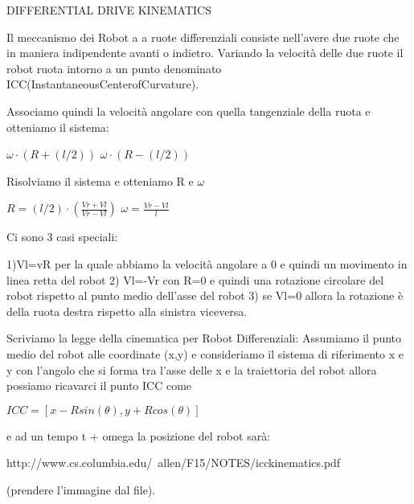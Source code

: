 \documentclass[11pt]{article}
\begin{document}
DIFFERENTIAL DRIVE KINEMATICS

Il meccanismo dei Robot a a ruote differenziali consiste nell'avere due ruote che in maniera indipendente avanti o indietro.
Variando la velocità delle due ruote il robot ruota intorno a un punto denominato ICC(InstantaneousCenterofCurvature).

Associamo quindi la velocità angolare con quella tangenziale della ruota e otteniamo il sistema:

$\omega\cdot(R+(l/2))$
$\omega\cdot(R-(l/2))$

Risolviamo il sistema e otteniamo R e $\omega$

$ R = (l/2)\cdot(\frac{Vr+Vl}{Vr-Vl})$
$\omega=\frac{Vr-Vl}{l}$

Ci sono 3 casi speciali:

1)Vl=vR per la quale abbiamo la velocità angolare a 0 e quindi un movimento in linea retta del robot
2) Vl=-Vr con R=0 e quindi una rotazione circolare del robot rispetto al punto medio dell'asse del robot
3) se Vl=0 allora la rotazione è della ruota destra rispetto alla sinistra  viceversa.

Scriviamo la legge della cinematica per Robot Differenziali:
Assumiamo il punto medio del robot alle coordinate (x,y) e consideriamo il sistema di riferimento x e y con \theta l'angolo che si forma tra l'asse delle x e la traiettoria del robot allora possiamo ricavarci il punto ICC come 

$ ICC = [ x - Rsin(\theta), y + Rcos(\theta) ] $

e ad un tempo t + omega la posizione del robot sarà:

http://www.cs.columbia.edu/~allen/F15/NOTES/icckinematics.pdf

(prendere l'immagine dal file).
\end{document}
